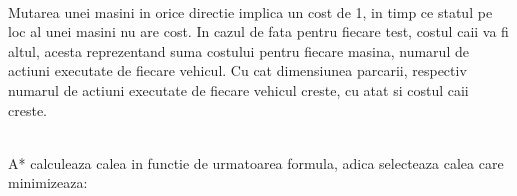 \documentclass{article}
\begin{document}
\begin{flushleft}
\quad\\ Mutarea unei masini in orice directie implica un cost de 1, in timp ce statul pe loc al unei masini nu are cost. In cazul de fata pentru fiecare test, costul caii va fi altul, acesta reprezentand suma costului pentru fiecare masina, numarul de actiuni executate de fiecare vehicul. Cu cat dimensiunea parcarii, respectiv numarul de actiuni executate de fiecare vehicul creste, cu atat si costul caii creste.\\\par

\quad\\ A* calculeaza calea in functie de urmatoarea formula, adica selecteaza calea care minimizeaza:\\ \par
\vspace{25cm}


\end{flushleft}
\end{document}

